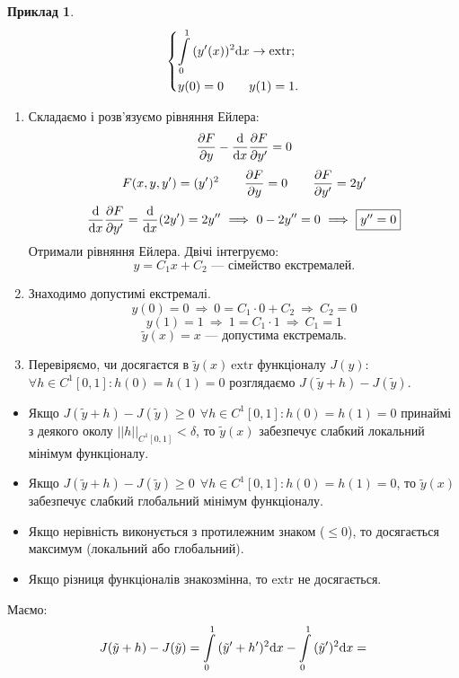 \documentclass[14pt,a4paper]{scrartcl}
\theoremstyle{definition}
\newtheorem*{example}{Приклад}
\theoremstyle{definition}
\theoremstyle{definition}
\begin{document}
\begin{example}
 $$
 \begin{dcases}
   \int\limits_{0}^{ 1}{(y'(x))^2 \mathrm{d} x} \to \mathrm{extr};\\
   y(0) = 0 \qquad y(1) = 1.
 \end{dcases}
 $$
 \begin{enumerate}
   \item Складаємо і розв'язуємо рівняння Ейлера:
   $$
   \frac{\partial F}{\partial y} - \frac{\mathrm{d} }{ \mathrm{d} x} \frac{\partial F}{\partial y'} = 0
   $$
   $$
   F(x,y,y') = (y')^2 \qquad \frac{\partial F}{\partial y} = 0 \qquad \frac{\partial F}{\partial y'} = 2y'
   $$
   $$
   \frac{\mathrm{d}}{\mathrm{d} x} \frac{\partial F}{ \partial y'} = \frac{\mathrm{d}}{\mathrm{d} x} (2 y') = 2 y''  \ \Longrightarrow \
   0 - 2y'' = 0 \ \Longrightarrow \  \fbox{$y'' = 0$}
   $$
   Отримали рівняння Ейлера. Двічі інтегруємо:
   $$
   y = C_1 x + C_2 \text{ --- сімейство екстремалей.}
   $$
   \item Знаходимо допустимі екстремалі.
   $$
   y(0) = 0 \ \Rightarrow \  0 = C_1 \cdot 0 + C_2 \ \Rightarrow \  C_2 = 0
   $$
   $$
   y(1) = 1 \ \Rightarrow \  1 = C_1 \cdot 1 \ \Rightarrow \  C_1 = 1
   $$
   $$
   \tilde{y}(x) = x \text{ --- допустима екстремаль.}
   $$
   \item Перевіряємо, чи досягаєтся в $\tilde{y} (x)\  \mathrm{extr}$ функціоналу $J(y)$:\\
   $
   \forall h \in C^1 [0,1] : h(0) = h(1) = 0
   $ розглядаємо $J(\tilde{y} + h) - J(\tilde{y})$.\\
 \end{enumerate}
 \begin{itemize}
   \item    Якщо $J(\tilde{y}+ h) - J(\tilde{y})  \geq 0 \ \ \forall h \in C^1 [0,1] : h(0) = h(1) = 0$  принаймі з деякого околу $||h||_{C^1 [0,1]} < \delta$, то $\tilde{y} (x) $ забезпечує слабкий локальний мінімум функціоналу.
   \item Якщо $J(\tilde{y}+ h) - J(\tilde{y})  \geq 0 \ \ \forall h \in C^1 [0,1] : h(0) = h(1) = 0$, то $\tilde{y} (x) $ забезпечує слабкий глобальний мінімум функціоналу.
   \item Якщо нерівність виконується з протилежним знаком ($ \leq 0$), то досягається максимум (локальний або глобальний).
   \item Якщо різниця функціоналів знакозмінна, то extr не досягається.
 \end{itemize}
 Маємо:
 $$
 J(\tilde{y} + h) - J(\tilde{y}) =  \int\limits_{0}^{1}{ (\tilde{y}' + h')^2 \mathrm{d}x} -  \int\limits_{0}^{ 1}{ (\tilde{y}')^2 \mathrm{d} x} =
$$
\end{example}
\end{document}
